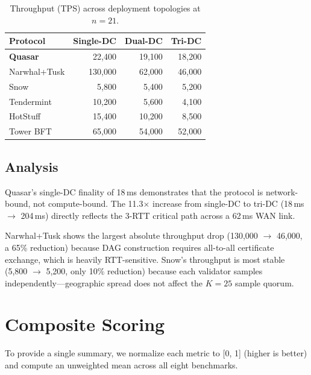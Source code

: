 \documentclass[11pt]{article}
\begin{document}
\begin{table}[h]
\centering
\begin{tabular}{@{}lrrr@{}}
\toprule
\textbf{Protocol} & \textbf{Single-DC} & \textbf{Dual-DC} & \textbf{Tri-DC} \\
\midrule
\textbf{Quasar}   & 22{,}400 & 19{,}100 & 18{,}200 \\
Narwhal+Tusk      & 130{,}000 & 62{,}000 & 46{,}000 \\
Snow              & 5{,}800  & 5{,}400  & 5{,}200 \\
Tendermint        & 10{,}200 & 5{,}600  & 4{,}100 \\
HotStuff          & 15{,}400 & 10{,}200 & 8{,}500 \\
Tower BFT         & 65{,}000 & 54{,}000 & 52{,}000 \\
\bottomrule
\end{tabular}
\caption{Throughput (TPS) across deployment topologies at $n=21$.}
\label{tab:geo-throughput}
\end{table}

\subsection{Analysis}

Quasar's single-DC finality of 18\,ms demonstrates that the protocol is
network-bound, not compute-bound. The 11.3$\times$ increase from single-DC to tri-DC
(18\,ms $\to$ 204\,ms) directly reflects the 3-RTT critical path across a 62\,ms
WAN link.

Narwhal+Tusk shows the largest absolute throughput drop (130{,}000 $\to$ 46{,}000, a
65\% reduction) because DAG construction requires all-to-all certificate exchange, which
is heavily RTT-sensitive. Snow's throughput is most stable (5{,}800 $\to$ 5{,}200, only
10\% reduction) because each validator samples independently---geographic spread does not
affect the $K=25$ sample quorum.

\section{Composite Scoring}
\label{sec:composite}

To provide a single summary, we normalize each metric to [0, 1] (higher is better) and
compute an unweighted mean across all eight benchmarks.
\end{document}
